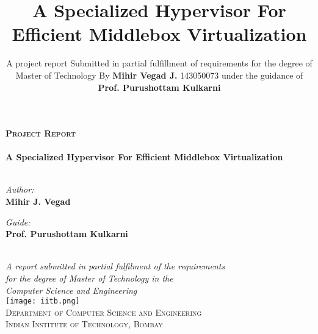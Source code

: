 \documentclass[a4paper,11pt]{report}
\title{\vspace{3pt} A Specialized Hypervisor For Efficient Middlebox Virtualization}
\author{\vspace{2cm} A project report \vspace{3cm} Submitted in partial fulfillment of requirements for the degree of \vspace{2cm} Master of Technology \vspace{2cm} By \vspace{2cm} \textbf{Mihir Vegad J.} \vspace{1cm} 143050073 \vspace{2cm} under the guidance of \vspace{2cm} \textbf{Prof. Purushottam Kulkarni} \vspace{2cm}  
  }
\begin{document}




\begin{titlepage}
\begin{center}

\vspace*{2cm}

\textsc{\Large \bf Project Report}\\[0.85cm]

\hrulefill
\\[1cm]
{\huge \bf A Specialized Hypervisor For Efficient Middlebox Virtualization}\\[0.4cm]
\hrulefill
\\[1cm]

\begin{minipage}{0.44\textwidth}
\begin{flushleft} \large
\emph{Author:}\\
{\Large \textbf {Mihir J. Vegad}}
\end{flushleft}
\end{minipage}
\begin{minipage}{0.44\textwidth}
\begin{flushright} \large
\emph{Guide:} \\
{\Large \textbf {Prof. Purushottam Kulkarni}}
\end{flushright}
\end{minipage}\\[2cm]

\large \textit{A report submitted in partial fulfilment of the requirements\\
[0.5cm] for the degree of Master of Technology in the\\ 
[0.5cm]Computer Science and Engineering}\\[2cm]

\texttt{[image: iitb.png]}\\[0.75cm]

\textsc{\large Department of Computer Science and Engineering\\Indian Institute of Technology, Bombay}
\\[1cm]

\end{center}
\end{titlepage}
\clearpage
\end{document}
